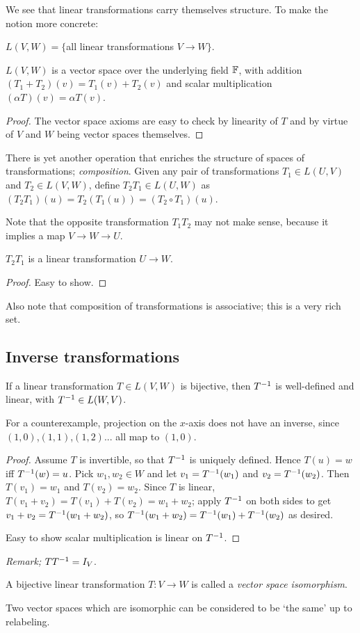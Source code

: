 We see that linear transformations carry themselves structure. To make the notion more concrete:

\begin{definition}
  $L(V,W)=\{$all linear transformations $V\to W\}$.
\end{definition}
\begin{theorem}
  $L(V,W)$ is a vector space over the underlying field $\mathbb{F}$, with addition $(T_1+T_2)(v)=T_1(v)+T_2(v)$ and scalar multiplication $(\alpha T)(v)=\alpha T(v)$.
\end{theorem}
\begin{proof}
  The vector space axioms are easy to check by linearity of $T$ and by virtue of $V$ and $W$ being vector spaces themselves.
\end{proof}


There is yet another operation that enriches the structure of spaces of transformations; \emph{composition}. Given any pair of transformations $T_1\in L(U,V)$ and $T_2\in L(V,W)$, define $T_2 T_1\in L(U,W)$ as $(T_2 T_1)(u) = T_2(T_1(u))=(T_2\circ T_1)(u)$.

Note that the opposite transformation $T_1 T_2$ may not make sense, because it implies a map $V\to W\to U$.

\begin{proposition}
  $T_2T_1$ is a linear transformation $U\to W$.
\end{proposition}
\begin{proof}
  Easy to show.
\end{proof}

Also note that composition of transformations is associative; this is a very rich set.

\subsection{Inverse transformations}

\begin{theorem}\label{thm:bijimpinv}
  If a linear transformation $T\in L(V,W)$ is bijective, then $T^{-1}$ is well-defined and linear, with $T^{-1}\in L(W,V)$.
\end{theorem}

For a counterexample, projection on the $x$-axis does not have an inverse, since $(1,0)$,$(1,1)$,$(1,2)$... all map to $(1,0)$.

\begin{proof}
  Assume $T$ is invertible, so that $T^{-1}$ is uniquely defined. Hence $T(u)=w$ iff $T^{-1}(w)=u$. Pick $w_1,w_2\in W$ and let $v_1=T^{-1}(w_1)$ and $v_2=T^{-1}(w_2)$. Then $T(v_1)=w_1$ and $T(v_2)=w_2$. Since $T$ is linear, $T(v_1+v_2)=T(v_1)+T(v_2)=w_1+w_2$; apply $T^{-1}$ on both sides to get $v_1+v_2=T^{-1}(w_1+w_2)$, so $T^{-1}(w_1+w_2)=T^{-1}(w_1)+T^{-1}(w_2)$ as desired.

  Easy to show scalar multiplication is linear on $T^{-1}$.
\end{proof}

\emph{Remark;} $TT^{-1}=I_V$.


\begin{definition}
  A bijective linear transformation $T:V\to W$ is called a \emph{vector space isomorphism}.
\end{definition}

Two vector spaces which are isomorphic can be considered to be `the same' up to relabeling.
